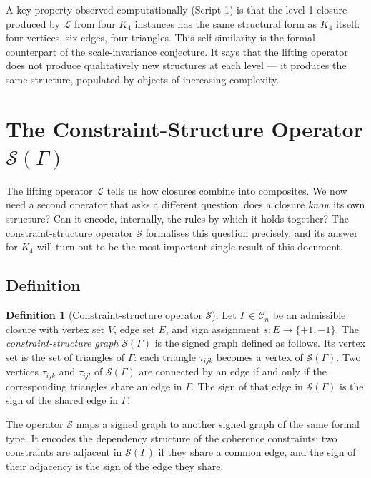 \documentclass[12pt,a4paper]{article}
\theoremstyle{plain}
\theoremstyle{definition}
\newtheorem{definition}[theorem]{Definition}
\theoremstyle{remark}
\newcommand{\Kfour}{K_4}
\newcommand{\Calg}{\mathcal{C}}
\newcommand{\Sop}{\mathcal{S}}
\newcommand{\Lop}{\mathcal{L}}
\begin{document}
A key property observed computationally (Script 1) is that the level-1 closure
produced by $\Lop$ from four $\Kfour$ instances has the same structural form as
$\Kfour$ itself: four vertices, six edges, four triangles. This self-similarity is
the formal counterpart of the scale-invariance conjecture. It says that the lifting
operator does not produce qualitatively new structures at each level --- it produces
the same structure, populated by objects of increasing complexity.

\section{The Constraint-Structure Operator
         \texorpdfstring{$\Sop(\Gamma)$}{S(Γ)}}
\label{sec:S}

The lifting operator $\Lop$ tells us how closures combine into composites. We now
need a second operator that asks a different question: does a closure \emph{know}
its own structure? Can it encode, internally, the rules by which it holds together?
The constraint-structure operator $\Sop$ formalises this question precisely, and its
answer for $\Kfour$ will turn out to be the most important single result of this
document.

\subsection{Definition}

\begin{definition}[Constraint-structure operator $\Sop$]
\label{def:S}
Let $\Gamma \in \Calg_n$ be an admissible closure with vertex set $V$, edge set $E$,
and sign assignment $s: E \to \{+1,-1\}$. The \emph{constraint-structure graph}
$\Sop(\Gamma)$ is the signed graph defined as follows. Its vertex set is the set of
triangles of $\Gamma$: each triangle $\tau_{ijk}$ becomes a vertex of $\Sop(\Gamma)$.
Two vertices $\tau_{ijk}$ and $\tau_{ijl}$ of $\Sop(\Gamma)$ are connected by an
edge if and only if the corresponding triangles share an edge in $\Gamma$. The sign
of that edge in $\Sop(\Gamma)$ is the sign of the shared edge in $\Gamma$.
\end{definition}

The operator $\Sop$ maps a signed graph to another signed graph of the same formal
type. It encodes the dependency structure of the coherence constraints: two
constraints are adjacent in $\Sop(\Gamma)$ if they share a common edge, and the sign
of their adjacency is the sign of the edge they share.
\end{document}
